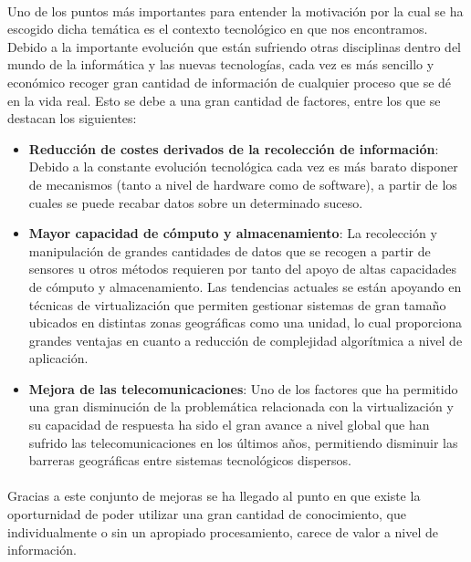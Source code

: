\documentclass{subfiles}
\begin{document}
    \paragraph{}
    Uno de los puntos más importantes para entender la motivación por la cual se ha escogido dicha temática es el contexto tecnológico en que nos encontramos. Debido a la importante evolución que están sufriendo otras disciplinas dentro del mundo de la informática y las nuevas tecnologías, cada vez es más sencillo y económico recoger gran cantidad de información de cualquier proceso que se dé en la vida real. Esto se debe a una gran cantidad de factores, entre los que se destacan los siguientes:

    \begin{itemize}

      \item \textbf{Reducción de costes derivados de la recolección de información}: Debido a la constante evolución tecnológica cada vez es más barato disponer de mecanismos (tanto a nivel de hardware como de software), a partir de los cuales se puede recabar datos sobre un determinado suceso.

      \item \textbf{Mayor capacidad de cómputo y almacenamiento}: La recolección y manipulación de grandes cantidades de datos que se recogen a partir de sensores u otros métodos requieren por tanto del apoyo de altas capacidades de cómputo y almacenamiento. Las tendencias actuales se están apoyando en técnicas de virtualización que permiten gestionar sistemas de gran tamaño ubicados en distintas zonas geográficas como una unidad, lo cual proporciona grandes ventajas en cuanto a reducción de complejidad algorítmica a nivel de aplicación.

      \item \textbf{Mejora de las telecomunicaciones}: Uno de los factores que ha permitido una gran disminución de la problemática relacionada con la virtualización y su capacidad de respuesta ha sido el gran avance a nivel global que han sufrido las telecomunicaciones en los últimos años, permitiendo disminuir las barreras geográficas entre sistemas tecnológicos dispersos.

    \end{itemize}

    \paragraph{}
    Gracias a este conjunto de mejoras se ha llegado al punto en que existe la oporturnidad de poder utilizar una gran cantidad de conocimiento, que individualmente o sin un apropiado procesamiento, carece de valor a nivel de información.
\end{document}
